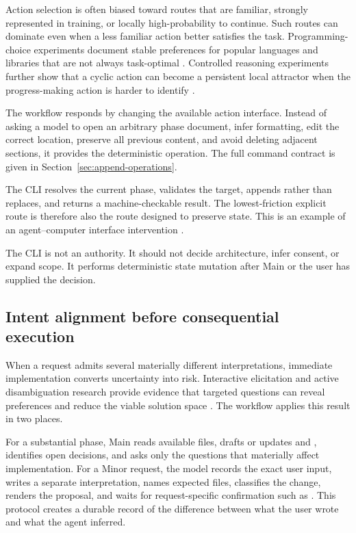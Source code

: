 \documentclass[11pt,a4paper]{article}
\newcommand{\code}[1]{\texttt{\detokenize{#1}}}
\begin{document}
Action selection is often biased toward routes that are familiar, strongly represented in training, or locally high-probability to continue. Such routes can dominate even when a less familiar action better satisfies the task. Programming-choice experiments document stable preferences for popular languages and libraries that are not always task-optimal \cite{twist2026}. Controlled reasoning experiments further show that a cyclic action can become a persistent local attractor when the progress-making action is harder to identify \cite{pipis2025}.

The workflow responds by changing the available action interface. Instead of asking a model to open an arbitrary phase document, infer formatting, edit the correct location, preserve all previous content, and avoid deleting adjacent sections, it provides the deterministic \code{aw phase append} operation. The full command contract is given in Section~\ref{sec:append-operations}.

The CLI resolves the current phase, validates the target, appends rather than replaces, and returns a machine-checkable result. The lowest-friction explicit route is therefore also the route designed to preserve state. This is an example of an agent--computer interface intervention \cite{yang2024}.

The CLI is not an authority. It should not decide architecture, infer consent, or expand scope. It performs deterministic state mutation after Main or the user has supplied the decision.

\subsection{Intent alignment before consequential execution}\label{sec:intent-alignment}

When a request admits several materially different interpretations, immediate implementation converts uncertainty into risk. Interactive elicitation and active disambiguation research provide evidence that targeted questions can reveal preferences and reduce the viable solution space \cite{li2025gate,kobalczyk2025}. The workflow applies this result in two places.

For a substantial phase, Main reads available files, drafts or updates \code{REQUESTS.md} and \code{PLAN.md}, identifies open decisions, and asks only the questions that materially affect implementation. For a Minor request, the model records the exact user input, writes a separate interpretation, names expected files, classifies the change, renders the proposal, and waits for request-specific confirmation such as \code{GO MinorFix 01}. This protocol creates a durable record of the difference between what the user wrote and what the agent inferred.
\end{document}
